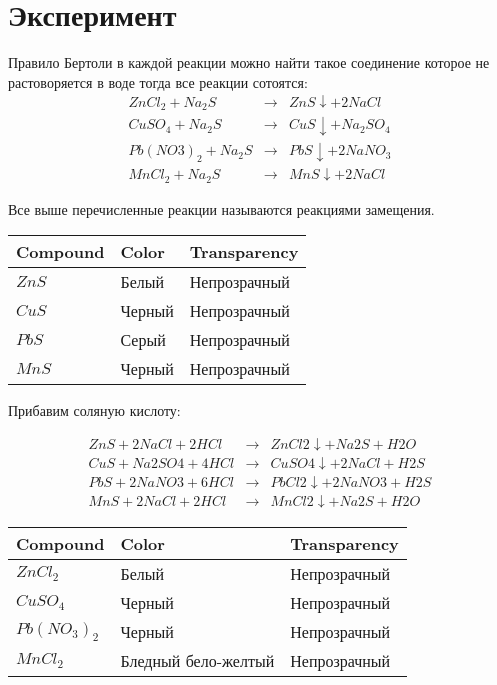 \section{Эксперимент}

\tab Правило Бертоли в каждой реакции можно 
найти такое соединение которое не растоворяется 
в воде тогда все реакции сотоятся:
\begin{eqnarray} 
 ZnCl_2 + Na_2S      &\rightarrow&  ZnS\downarrow + 2NaCl     \\
 CuSO_4 + Na_2S      &\rightarrow&  CuS\downarrow + Na_2SO_4  \\
 Pb(NO3)_2 + Na_2S   &\rightarrow&  PbS\downarrow + 2NaNO_3   \\
 MnCl_2 + Na_2S      &\rightarrow&  MnS\downarrow + 2NaCl 
\end{eqnarray} 

Все выше перечисленные реакции называются реакциями
замещения.

\begin{center}
    \begin{tabular}{l||l||l}
        Compound & Color & Transparency \\ \hline \hline
        $ZnS$ & Белый &     Непрозрачный \\
        $CuS$ & Черный &    Непрозрачный \\
        $PbS$ & Серый  &    Непрозрачный \\
        $MnS$ & Черный &    Непрозрачный
    \end{tabular}
\end{center}

Прибавим соляную кислоту:

\begin{eqnarray} 
    ZnS + 2NaCl + 2HCl      &\rightarrow& ZnCl2\downarrow + Na2S + H2O \\
    CuS + Na2SO4 + 4HCl     &\rightarrow& CuSO4\downarrow + 2NaCl + H2S \\
    PbS + 2NaNO3 + 6HCl     &\rightarrow& PbCl2\downarrow + 2NaNO3 + H2S \\
    MnS + 2NaCl + 2HCl      &\rightarrow& MnCl2\downarrow + Na2S + H2O
\end{eqnarray}

\begin{center}
    \begin{tabular}{l||l||l}
        Compound & Color & Transparency \\ \hline \hline 
        $ZnCl_2$ & Белый              &     Непрозрачный \\
        $CuSO_4$ & Черный             &     Непрозрачный \\
        $Pb(NO_3)_2$ & Черный          &    Непрозрачный \\
        $MnCl_2$ & Бледный бело-желтый &    Непрозрачный 
    \end{tabular}
\end{center}
